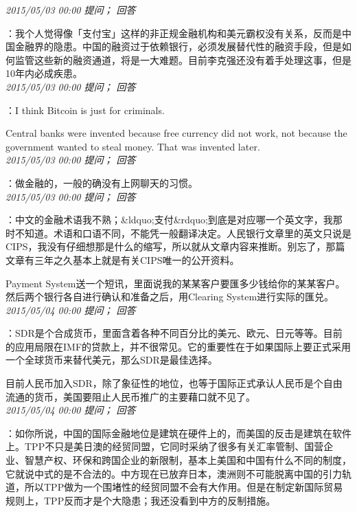 \documentclass[twocolumn]{ctexart}
\begin{document}
\textit{\hfill\noindent\small 2015/05/03 00:00 提问； 回答}

：我个人觉得像「支付宝」这样的非正规金融机构和美元霸权没有关系，反而是中国金融界的隐患。中国的融资过于依赖银行，必须发展替代性的融资手段，但是如何监管这些新的融资通道，将是一大难题。目前李克强还没有着手处理这事，但是10年内必成疾患。\\

\textit{\hfill\noindent\small 2015/05/03 00:00 提问； 回答}

：I think Bitcoin is just for criminals.

Central banks were invented because free currency did not work, not because the government wanted to steal money. That was invented later.\\

\textit{\hfill\noindent\small 2015/05/03 00:00 提问； 回答}

：做金融的，一般的确没有上网聊天的习惯。\\

\textit{\hfill\noindent\small 2015/05/03 00:00 提问； 回答}

：中文的金融术语我不熟；\&ldquo;支付\&rdquo;到底是对应哪一个英文字，我那时不知道。术语和口语不同，不能凭一般翻译决定。人民银行文章里的英文只说是CIPS，我没有仔细想那是什么的缩写，所以就从文章内容来推断。别忘了，那篇文章有三年之久基本上就是有关CIPS唯一的公开资料。

Payment System送一个短讯，里面说我的某某客户要匯多少钱给你的某某客户。然后两个银行各自进行确认和准备之后，用Clearing System进行实际的匯兑。\\

\textit{\hfill\noindent\small 2015/05/04 00:00 提问； 回答}

：SDR是个合成货币，里面含着各种不同百分比的美元、欧元、日元等等。目前的应用局限在IMF的贷款上，并不很常见。它的重要性在于如果国际上要正式采用一个全球货币来替代美元，那么SDR是最佳选择。

目前人民币加入SDR，除了象征性的地位，也等于国际正式承认人民币是个自由流通的货币，美国要阻止人民币推广的主要藉口就不见了。\\

\textit{\hfill\noindent\small 2015/05/04 00:00 提问； 回答}

：如你所说，中国的国际金融地位是建筑在硬件上的，而美国的反击是建筑在软件上。TPP不只是美日澳的经贸同盟，它同时采纳了很多有关汇率管制、国营企业、智慧产权、环保和跨国企业的新限制，基本上美国和中国有什么不同的制度，它就说中式的是不合法的。中方现在已放弃日本，澳洲则不可能脱离中国的引力轨道，所以TPP做为一个围堵性的经贸同盟不会有大作用。但是在制定新国际贸易规则上，TPP反而才是个大隐患；我还没看到中方的反制措施。
\end{document}

